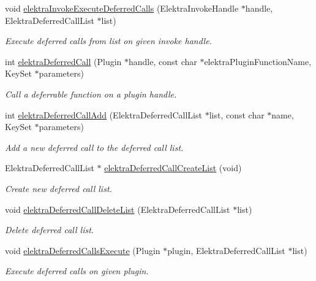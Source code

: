 \begin{DoxyCompactItemize}
void \hyperlink{group__invoke_ga933ae8c38aadef6af1462297fcfb5041}{elektra\+Invoke\+Execute\+Deferred\+Calls} (Elektra\+Invoke\+Handle $\ast$handle, Elektra\+Deferred\+Call\+List $\ast$list)
\begin{DoxyCompactList}\small\item\em Execute deferred calls from list on given invoke handle. \end{DoxyCompactList}\item 
int \hyperlink{group__invoke_ga80328407d9d418af04c54ab5f10a63c0}{elektra\+Deferred\+Call} (Plugin $\ast$handle, const char $\ast$elektra\+Plugin\+Function\+Name, Key\+Set $\ast$parameters)
\begin{DoxyCompactList}\small\item\em Call a deferrable function on a plugin handle. \end{DoxyCompactList}\item 
int \hyperlink{group__invoke_gaa6200aa148a20b58d62cd8cc73f293ce}{elektra\+Deferred\+Call\+Add} (Elektra\+Deferred\+Call\+List $\ast$list, const char $\ast$name, Key\+Set $\ast$parameters)
\begin{DoxyCompactList}\small\item\em Add a new deferred call to the deferred call list. \end{DoxyCompactList}\item 
Elektra\+Deferred\+Call\+List $\ast$ \hyperlink{group__invoke_gacff96e795f6fc2fad61ed2f8a5cd80cb}{elektra\+Deferred\+Call\+Create\+List} (void)
\begin{DoxyCompactList}\small\item\em Create new deferred call list. \end{DoxyCompactList}\item 
void \hyperlink{group__invoke_ga7b9d8b37ebd5205fded885164d3ad6b7}{elektra\+Deferred\+Call\+Delete\+List} (Elektra\+Deferred\+Call\+List $\ast$list)
\begin{DoxyCompactList}\small\item\em Delete deferred call list. \end{DoxyCompactList}\item 
void \hyperlink{group__invoke_gad59c673dce3c2f08fbe52c5c667f55ce}{elektra\+Deferred\+Calls\+Execute} (Plugin $\ast$plugin, Elektra\+Deferred\+Call\+List $\ast$list)
\begin{DoxyCompactList}\small\item\em Execute deferred calls on given plugin. \end{DoxyCompactList}\end{DoxyCompactItemize}


